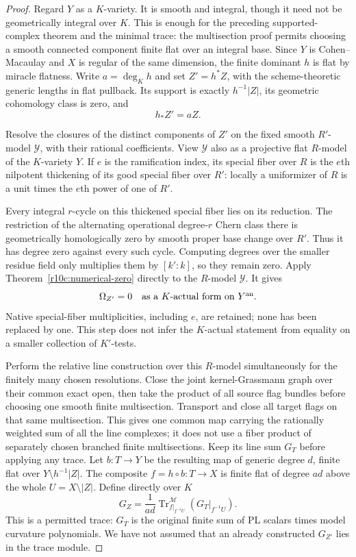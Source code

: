 \documentclass[11pt]{article}
\theoremstyle{definition}
\theoremstyle{remark}
\numberwithin{equation}{section}
\begin{document}
\begin{proof}
Regard $Y$ as a $K$-variety.  It is smooth and integral, though it
need not be geometrically integral over $K$.  This is enough for
the preceding supported-complex theorem and the minimal trace:
the multisection proof permits choosing a smooth connected component
finite flat over an integral base.  Since $Y$ is Cohen--Macaulay
and $X$ is regular of the same dimension, the finite dominant $h$
is flat by miracle flatness.  Write $a=\deg_K h$ and set $Z'=h^*Z$,
with the scheme-theoretic generic lengths in flat pullback.
Its support is exactly $h^{-1}|Z|$, its geometric cohomology class
is zero, and
\[
                                  h_*Z'=aZ.
\tag{PC12}\label{r11p:finite-cover-cycle-degree}
\]

Resolve the closures of the distinct components of $Z'$ on the
fixed smooth $R'$-model $\mathcal Y$, with their rational
coefficients.  View $\mathcal Y$ also as a projective flat
$R$-model of the $K$-variety $Y$.  If $e$ is the ramification index,
its special fiber over $R$ is the $e$th nilpotent thickening of its
good special fiber over $R'$: locally a uniformizer of $R$ is a
unit times the $e$th power of one of $R'$.

Every integral $r$-cycle on this thickened special fiber lies on
its reduction.  The restriction of the alternating operational
degree-$r$ Chern class there is geometrically homologically zero
by smooth proper base change over $R'$.  Thus it has degree zero
against every such cycle.  Computing degrees over the smaller
residue field only multiplies them by $[k':k]$, so they remain zero.
Apply Theorem~\ref{r10c:numerical-zero} directly to the $R$-model
$\mathcal Y$.  It gives
\[
              \Omega_{Z'}=0
                       \quad\hbox{as a $K$-actual form on $Y^{\rm an}$}.
\]
Native special-fiber multiplicities, including $e$, are retained;
none has been replaced by one.  This step does not infer the
$K$-actual statement from equality on a smaller collection of
$K'$-tests.

Perform the relative line construction over this $R$-model
simultaneously for the finitely many chosen resolutions.  Close the
joint kernel-Grassmann graph over their common exact open, then take
the product of all source flag bundles before choosing one smooth
finite multisection.  Transport and close all target flags on that
same multisection.  This gives one common map carrying the rationally
weighted sum of all the line complexes; it does not use a fiber
product of separately chosen branched finite multisections.
Keep its line sum $G_T$ before applying any trace.  Let $b:T\to Y$
be the resulting map of generic degree $d$, finite flat over
$Y\setminus h^{-1}|Z|$.  The composite
$f=h\circ b:T\to X$ is finite flat of degree $ad$ above the whole
$U=X\setminus|Z|$.  Define directly over $K$
\[
                   G_Z=\frac1{ad}
                       \operatorname{Tr}^{\mathscr M}_{f|_{f^{-1}U}}
                                      (G_T|_{f^{-1}U}).
\tag{PC13}\label{r11p:potential-good-formula}
\]
This is a permitted trace: $G_T$ is the original finite sum of
PL scalars times model curvature polynomials.  We have not assumed
that an already constructed $G_{Z'}$ lies in the trace module.


\end{proof}
\end{document}
